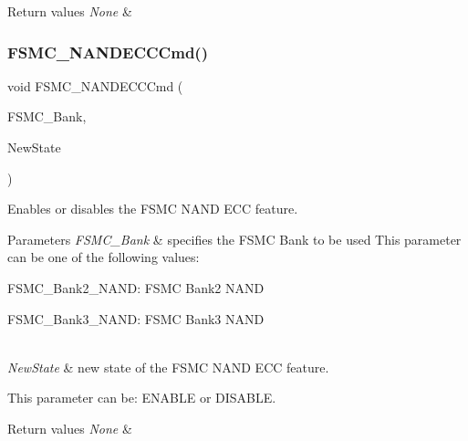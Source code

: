 \begin{DoxyRetVals}{Return values}
{\em None} & \\
\hline
\end{DoxyRetVals}
\mbox{\label{group___f_s_m_c___exported___functions_ga5800301fc39bbe998a18ebd9ff191cdc}} 
\subsubsection{\texorpdfstring{FSMC\_NANDECCCmd()}{FSMC\_NANDECCCmd()}}
{\footnotesize\ttfamily void F\+S\+M\+C\+\_\+\+N\+A\+N\+D\+E\+C\+C\+Cmd (\begin{DoxyParamCaption}\item[{uint32\+\_\+t}]{F\+S\+M\+C\+\_\+\+Bank,  }\item[{\mbox{\hyperlink{group___exported__types_gac9a7e9a35d2513ec15c3b537aaa4fba1}{Functional\+State}}}]{New\+State }\end{DoxyParamCaption})}



Enables or disables the F\+S\+MC N\+A\+ND E\+CC feature. 


\begin{DoxyParams}{Parameters}
{\em F\+S\+M\+C\+\_\+\+Bank} & specifies the F\+S\+MC Bank to be used This parameter can be one of the following values\+: \begin{DoxyItemize}
\item F\+S\+M\+C\+\_\+\+Bank2\+\_\+\+N\+A\+ND\+: F\+S\+MC Bank2 N\+A\+ND \item F\+S\+M\+C\+\_\+\+Bank3\+\_\+\+N\+A\+ND\+: F\+S\+MC Bank3 N\+A\+ND \end{DoxyItemize}
\\
\hline
{\em New\+State} & new state of the F\+S\+MC N\+A\+ND E\+CC feature.\\
\hline
\end{DoxyParams}
This parameter can be\+: E\+N\+A\+B\+LE or D\+I\+S\+A\+B\+LE. 
\begin{DoxyRetVals}{Return values}
{\em None} & \\
\hline
\end{DoxyRetVals}
\mbox{\label{group___f_s_m_c___exported___functions_ga9f81ccc4e126c11f1eb33077b1a68e6f}} 

